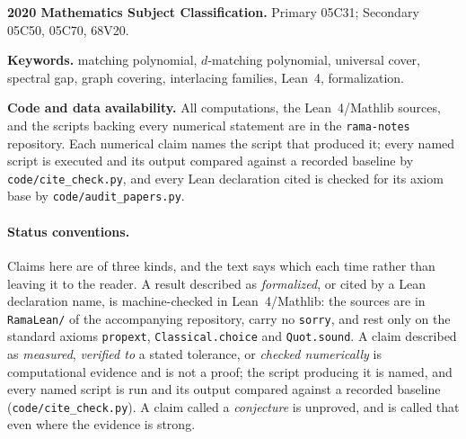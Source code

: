 \documentclass[11pt]{article}
\theoremstyle{remark}
\begin{document}
\begin{abstract}
This explains the one feature of Hall's family that had resisted explanation, the pendant leaves.
They create the root $\sqrt5$ and simultaneously double the boundary of the relevant star, carrying
it away from the Aomoto inequality; removing them destroys both. A counterexample must give its
branches a private boundary, which is a condition on attachment rather than on degrees, and that is
where a repair should be sought.

Everything asserted is machine-checked in Lean~4/Mathlib unless labelled otherwise. Supplementary
material is in \cite{Supp}; the biregular case is \cite{PartII}.
\end{abstract}

\medskip
\noindent\textbf{2020 Mathematics Subject Classification.} Primary 05C31; Secondary 05C50,
05C70, 68V20.

\noindent\textbf{Keywords.} matching polynomial, $d$-matching polynomial, universal cover,
spectral gap, graph covering, interlacing families, Lean~4, formalization.

\noindent\textbf{Code and data availability.} All computations, the Lean~4/Mathlib sources, and
the scripts backing every numerical statement are in the \texttt{rama-notes} repository. Each
numerical claim names the script that produced it; every named script is executed and its output
compared against a recorded baseline by \texttt{code/cite\_check.py}, and every Lean declaration
cited is checked for its axiom base by \texttt{code/audit\_papers.py}.

\paragraph{Status conventions.} Claims here are of three kinds, and the text says which each time
rather than leaving it to the reader. A result described as \emph{formalized}, or cited by a Lean
declaration name, is machine-checked in Lean~4/Mathlib: the sources are in \texttt{RamaLean/} of
the accompanying repository, carry no \texttt{sorry}, and rest only on the standard axioms
\texttt{propext}, \texttt{Classical.choice} and \texttt{Quot.sound}. A claim described as
\emph{measured}, \emph{verified to} a stated tolerance, or \emph{checked numerically} is
computational evidence and is not a proof; the script producing it is named, and every named
script is run and its output compared against a recorded baseline
(\texttt{code/cite\_check.py}). A claim called a \emph{conjecture} is unproved, and is called
that even where the evidence is strong.
\end{document}

